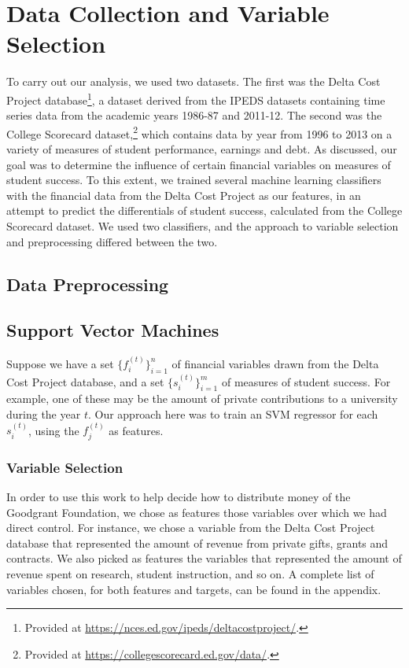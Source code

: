 \documentclass[paper.tex]{subfiles}
\begin{document}
\section{Data Collection and Variable Selection}
To carry out our analysis, we used two datasets. The first was the Delta Cost Project database\footnote{Provided at \url{https://nces.ed.gov/ipeds/deltacostproject/}.}, a dataset derived from the IPEDS datasets containing time series data from the academic years 1986-87 and 2011-12. The second was the College Scorecard dataset,\footnote{Provided at \url{https://collegescorecard.ed.gov/data/}.} which contains data by year from 1996 to 2013 on a variety of measures of student performance, earnings and debt. As discussed, our goal was to determine the influence of certain financial variables on measures of student success. To this extent, we trained several machine learning classifiers with the financial data from the Delta Cost Project as our features, in an attempt to predict the differentials of student success, calculated from the College Scorecard dataset. We used two classifiers, and the approach to variable selection and preprocessing differed between the two.

\subsection{Data Preprocessing}


\subsection{Support Vector Machines} 
Suppose we have a set $\{ f_i^{(t)} \}_{i = 1}^n$ of financial variables drawn from the Delta Cost Project database, and a set $\{ s_i^{(t)} \}_{i = 1}^m$ of measures of student success. For example, one of these may be the amount of private contributions to a university during the year $t$. Our approach here was to train an SVM regressor for each $s_i^{(t)}$, using the $f_j^{(t)}$ as features. 
\subsubsection{Variable Selection} 
In order to use this work to help decide how to distribute money of the Goodgrant Foundation, we chose as features those variables over which we had direct control. For instance, we chose a variable from the Delta Cost Project database that represented the amount of revenue from private gifts, grants and contracts. We also picked as features the variables that represented the amount of revenue spent on research, student instruction, and so on. A complete list of variables chosen, for both features and targets, can be found in the appendix.  
\end{document}
